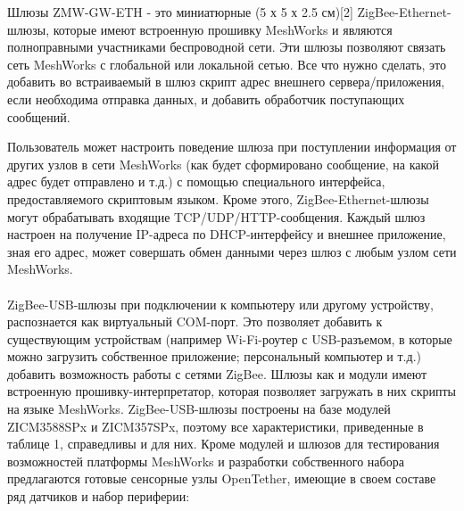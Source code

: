 \documentclass[11pt]{article}
\begin{document}
Шлюзы ZMW-GW-ETH - это миниатюрные (5 х 5 х 2.5 см)[2] ZigBee-Ethernet-шлюзы, которые 
имеют встроенную прошивку MeshWorks и являются полноправными участниками
беспроводной сети. Эти шлюзы позволяют связать сеть MeshWorks с глобальной или 
локальной сетью. Все что нужно сделать, это добавить во встраиваемый в шлюз скрипт 
адрес внешнего сервера/приложения, если необходима отправка данных, и добавить
обработчик поступающих сообщений.

Пользователь может настроить поведение шлюза при поступлении информация от других 
узлов в сети MeshWorks (как будет сформировано сообщение, на какой адрес будет отправлено
и т.д.) с помощью специального интерфейса, предоставляемого скриптовым языком. 
Кроме этого, ZigBee-Ethernet-шлюзы могут обрабатывать входящие TCP/UDP/HTTP-сообщения.
Каждый шлюз настроен на получение IP-адреса по DHCP-интерфейсу и
внешнее приложение, зная его адрес, может совершать обмен данными через шлюз с любым
узлом сети MeshWorks.
\\\\
ZigBee-USB-шлюзы при подключении к компьютеру или другому устройству, распознается
как виртуальный COM-порт. Это позволяет добавить к существующим устройствам 
(например Wi-Fi-роутер с USB-разъемом, в которые можно загрузить собственное приложение;
персональный компьютер и т.д.) добавить возможность работы с сетями ZigBee. Шлюзы
как и модули имеют встроенную прошивку-интерпретатор, которая позволяет загружать
в них скрипты на языке MeshWorks. ZigBee-USB-шлюзы построены на базе модулей ZICM3588SPx и 
ZICM357SPx, поэтому все характеристики, приведенные в таблице 1, справедливы и для них.
\newpage
Кроме модулей и шлюзов для тестирования возможностей платформы MeshWorks и разработки
собственного набора предлагаются готовые сенсорные узлы OpenTether, имеющие в своем 
составе ряд датчиков и набор периферии:
\end{document}

